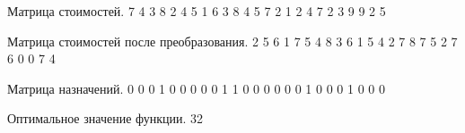 Матрица стоимостей.
   7   4   3   8   2
   4   5   1   6   3
   8   4   5   7   2
   1   2   4   7   2
   3   9   9   2   5

Матрица стоимостей после преобразования.
   2   5   6   1   7
   5   4   8   3   6
   1   5   4   2   7
   8   7   5   2   7
   6   0   0   7   4

Матрица назначений.
   0   0   0   1   0
   0   0   0   0   1
   1   0   0   0   0
   0   0   1   0   0
   0   1   0   0   0

Оптимальное значение функции.
32
